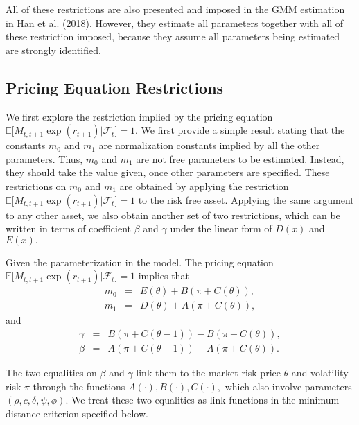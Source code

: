 \documentclass[11pt, letterpaper, twoside]{article}
\begin{document}
All of these restrictions are also presented and imposed in the GMM
estimation in Han et al. (2018). However, they estimate all parameters
together with all of these restriction imposed, because they assume all
parameters being estimated are strongly identified.

\subsection{Pricing Equation Restrictions}

We first explore the restriction implied by the pricing equation $\mathbb{E[}%
M_{t,t+1}\exp (r_{t+1})|\mathcal{F}_{t}]=1.$ We first provide a simple
result stating that the constants $m_{0}$ and $m_{1}$ are normalization
constants implied by all the other parameters. Thus, $m_{0}$ and $m_{1}$ are
not free parameters to be estimated. Instead, they should take the value
given, once other parameters are specified. These restrictions on $m_{0}$
and $m_{1}$ are obtained by applying the restriction $\mathbb{E[}%
M_{t,t+1}\exp (r_{t+1})|\mathcal{F}_{t}]=1$ to the risk free asset. Applying
the same argument to any other asset, we also obtain another set of two
restrictions, which can be written in terms of coefficient $\beta $ and $%
\gamma $ under the linear form of $D(x)$ and $E(x).$

\begin{lemma}
\label{Lemma m0 and m1}Given the parameterization in the model. The pricing
equation $\mathbb{E[}M_{t,t+1}\exp (r_{t+1})|\mathcal{F}_{t}]=1$ implies that%
\begin{eqnarray*}
m_{0} &=&E(\theta )+B\left( \pi +C\left( \theta \right) \right) , \\
m_{1} &=&D\left( \theta \right) +A\left( \pi +C\left( \theta \right) \right)
,
\end{eqnarray*}%
and%
\begin{eqnarray*}
\gamma  &=&B\left( \pi +C\left( \theta -1\right) \right) -B\left( \pi
+C\left( \theta \right) \right) , \\
\beta  &=&A\left( \pi +C\left( \theta -1\right) \right) -A\left( \pi
+C\left( \theta \right) \right) .
\end{eqnarray*}
\end{lemma}

The two equalities on $\beta $ and $\gamma $ link them to the market risk
price $\theta $ and volatility risk $\pi $ through the functions $A(\cdot
),B(\cdot ),C(\cdot ),$ which also involve parameters $(\rho ,c,\delta ,\psi
,\phi ).$ We treat these two equalities as link functions in the minimum
distance criterion specified below.
\end{document}
